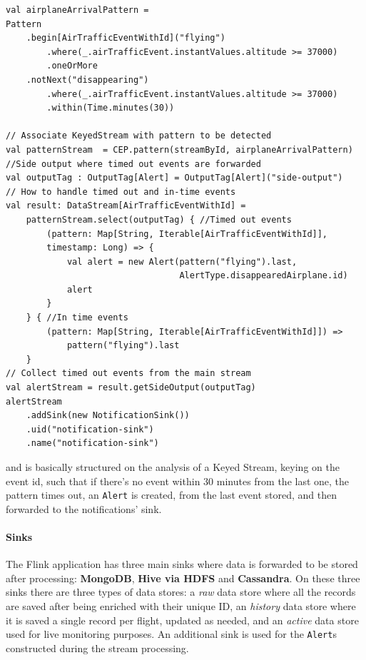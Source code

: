 \begin{verbatim}
val airplaneArrivalPattern = 
Pattern
    .begin[AirTrafficEventWithId]("flying")
        .where(_.airTrafficEvent.instantValues.altitude >= 37000)
        .oneOrMore
    .notNext("disappearing")
        .where(_.airTrafficEvent.instantValues.altitude >= 37000)
        .within(Time.minutes(30))

// Associate KeyedStream with pattern to be detected
val patternStream  = CEP.pattern(streamById, airplaneArrivalPattern)
//Side output where timed out events are forwarded
val outputTag : OutputTag[Alert] = OutputTag[Alert]("side-output")
// How to handle timed out and in-time events
val result: DataStream[AirTrafficEventWithId] = 
    patternStream.select(outputTag) { //Timed out events
        (pattern: Map[String, Iterable[AirTrafficEventWithId]], 
        timestamp: Long) => {
            val alert = new Alert(pattern("flying").last, 
                                  AlertType.disappearedAirplane.id)
            alert
        }
    } { //In time events
        (pattern: Map[String, Iterable[AirTrafficEventWithId]]) =>
            pattern("flying").last
    }   
// Collect timed out events from the main stream
val alertStream = result.getSideOutput(outputTag)
alertStream
    .addSink(new NotificationSink())
    .uid("notification-sink")
    .name("notification-sink")
\end{verbatim}

and is basically structured on the analysis of a Keyed Stream, keying on the event id, such that if there's no event within 30 minutes from the last one, the pattern times out, an \texttt{Alert} is created, from the last event stored, and then forwarded to the notifications' sink.

\paragraph{Sinks}

The Flink application has three main sinks where data is forwarded to be stored after processing: \textbf{MongoDB}, \textbf{Hive via HDFS} and \textbf{Cassandra}. On these three sinks there are three types of data stores: a \textit{raw} data store where all the records are saved after being enriched with their unique ID, an \textit{history} data store where it is saved a single record per flight, updated as needed, and an \textit{active} data store used for live monitoring purposes. An additional sink is used for the \texttt{Alert}s constructed during the stream processing.

